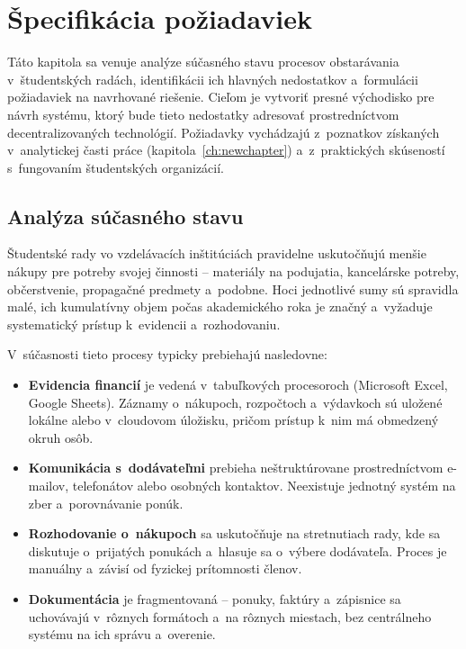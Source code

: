 \chapter{Špecifikácia požiadaviek}
\label{ch:problem_statement}

Táto kapitola sa venuje analýze súčasného stavu procesov obstarávania
v~študentských radách, identifikácii ich hlavných nedostatkov
a~formulácii požiadaviek na navrhované riešenie. Cieľom je vytvoriť
presné východisko pre návrh systému, ktorý bude tieto nedostatky
adresovať prostredníctvom decentralizovaných technológií. Požiadavky
vychádzajú z~poznatkov získaných v~analytickej časti práce
(kapitola~\ref{ch:newchapter}) a~z~praktických skúseností s~fungovaním
študentských organizácií.

\section{Analýza súčasného stavu}
\label{sec:current_state}

Študentské rady vo vzdelávacích inštitúciách pravidelne uskutočňujú
menšie nákupy pre potreby svojej činnosti -- materiály na podujatia,
kancelárske potreby, občerstvenie, propagačné predmety a~podobne.
Hoci jednotlivé sumy sú spravidla malé, ich kumulatívny objem počas
akademického roka je značný a~vyžaduje systematický prístup
k~evidencii a~rozhodovaniu.

V~súčasnosti tieto procesy typicky prebiehajú nasledovne:
\begin{itemize}
    \item \textbf{Evidencia financií} je vedená v~tabuľkových
    procesoroch (Microsoft Excel, Google Sheets). Záznamy o~nákupoch,
    rozpočtoch a~výdavkoch sú uložené lokálne alebo v~cloudovom
    úložisku, pričom prístup k~nim má obmedzený okruh osôb.

    \item \textbf{Komunikácia s~dodávateľmi} prebieha neštruktúrovane
    prostredníctvom e-mailov, telefonátov alebo osobných kontaktov.
    Neexistuje jednotný systém na zber a~porovnávanie ponúk.

    \item \textbf{Rozhodovanie o~nákupoch} sa uskutočňuje na stretnutiach
    rady, kde sa diskutuje o~prijatých ponukách a~hlasuje sa o~výbere
    dodávateľa. Proces je manuálny a~závisí od fyzickej prítomnosti
    členov.

    \item \textbf{Dokumentácia} je fragmentovaná -- ponuky, faktúry
    a~zápisnice sa uchovávajú v~rôznych formátoch a~na rôznych
    miestach, bez centrálneho systému na ich správu a~overenie.
\end{itemize}


